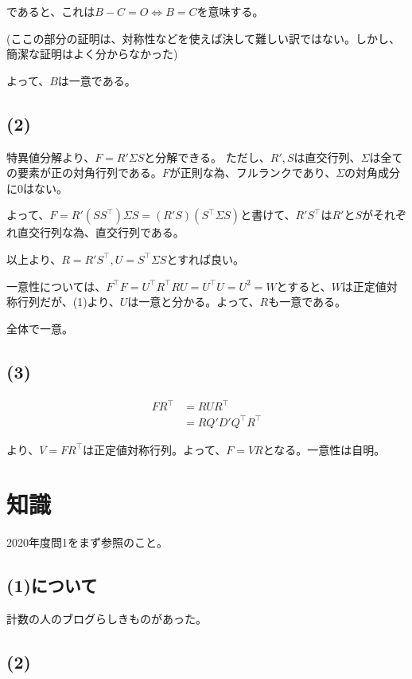\documentclass[a4paper, 10pt, dvipdfmx]{jlreq}
\begin{document}
であると、これは$B-C=O \Leftrightarrow B=C$を意味する。

(ここの部分の証明は、対称性などを使えば決して難しい訳ではない。しかし、簡潔な証明はよく分からなかった)

よって、$B$は一意である。

\subsection*{(2)}

特異値分解より、$F=R' \Sigma S$と分解できる。
ただし、$R',S$は直交行列、$\Sigma$は全ての要素が正の対角行列である。$F$が正則な為、フルランクであり、$\Sigma$の対角成分に0はない。

よって、$F=R' (SS^\top ) \Sigma S=(R'S)(S^\top \Sigma S) $と書けて、$R' S^\top $は$R'$と$S$がそれぞれ直交行列な為、直交行列である。

以上より、$R=R' S^\top ,U=S^\top  \Sigma S$とすれば良い。

一意性については、$F^\top F=U^\top R^\top RU=U^\top U=U^2=W$とすると、$W$は正定値対称行列だが、(1)より、$U$は一意と分かる。よって、$R$も一意である。

全体で一意。

\subsection*{(3)}

\begin{align*}
  FR^\top & =RUR^\top           \\
          & =RQ'D'Q^\top R^\top
\end{align*}

より、$V=FR^\top $は正定値対称行列。よって、$F=VR$となる。一意性は自明。

\section{知識}

2020年度問1をまず参照のこと。

\subsection*{(1)について}

計数の人のブログらしきものがあった。\cite{site:2}

\subsection*{(2)}
\end{document}
